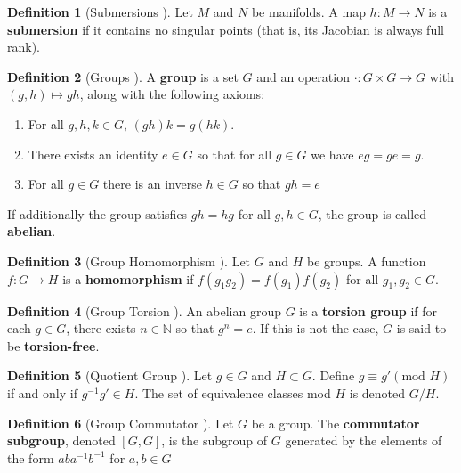 \documentclass[12pt]{article}
\theoremstyle{definition}
\newtheorem{defn}{Definition}
\begin{document}
\begin{defn}[Submersions \cite{robots-fiber-bundles}]
    Let \(M\) and \(N\) be manifolds. A map \(h : M \rightarrow N\) is a
    \textbf{submersion} if it contains no singular points (that is, its Jacobian
    is always full rank).
\end{defn}

\begin{defn}[Groups \cite{intro-top-manifolds}]
    A \textbf{group} is a set \(G\) and an operation 
    \(\cdot : G\times G \rightarrow G\) with \((g,h) \mapsto gh\), along with
    the following axioms:
    \begin{enumerate}
        \item For all \(g,h,k \in G\), \((gh)k = g(hk)\).
        \item There exists an identity \(e \in G\) so that for all \(g \in G\)
            we have \(eg = ge = g\).
        \item For all \(g \in G\) there is an inverse \(h \in G\) so that
        \(gh = e\)
    \end{enumerate}
    If additionally the group satisfies \(gh = hg\) for all \(g,h \in G\), the
    group is called \textbf{abelian}.
\end{defn}

\begin{defn}[Group Homomorphism \cite{intro-top-manifolds}]
    Let \(G\) and \(H\) be groups. A function \(f : G \rightarrow H\) is a
    \textbf{homomorphism} if \(f(g_1g_2) = f(g_1)f(g_2)\) for all 
    \(g_1,g_2 \in G\).
\end{defn}

\begin{defn}[Group Torsion \cite{intro-top-manifolds}]
    An abelian group \(G\) is a \textbf{torsion group} if for each \(g \in G\),
    there exists \(n \in \mathbb{N}\) so that \(g^n = e\). If this is not the
    case, \(G\) is said to be \textbf{torsion-free}.
\end{defn}

\begin{defn}[Quotient Group \cite{intro-top-manifolds}]
    Let \(g \in G\) and \(H \subset G\). Define \(g \equiv g' (\text{mod } H)\)
    if and only if \(g^{-1}g' \in H\). The set of equivalence classes mod \(H\)
    is denoted \(G/H\).
\end{defn}

\begin{defn}[Group Commutator \cite{intro-top-manifolds}]
    Let \(G\) be a group. The \textbf{commutator subgroup}, denoted \([G,G]\),
    is the subgroup of \(G\) generated by the elements of the form
    \(a b a^{-1} b^{-1}\) for \(a,b \in G\)
\end{defn}
\end{document}
